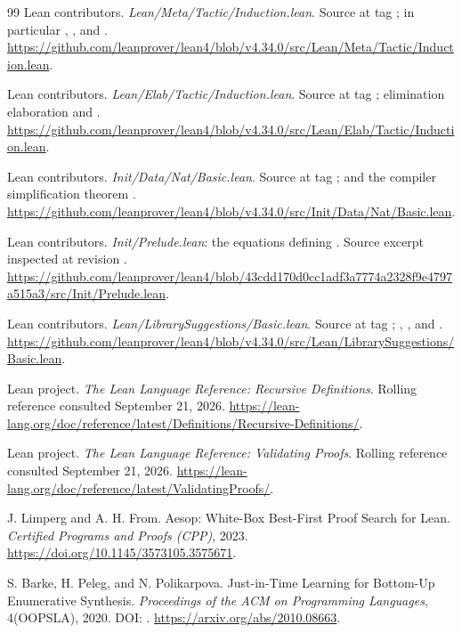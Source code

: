 \begin{thebibliography}{99}
Lean contributors.
\emph{Lean/Meta/Tactic/Induction.lean}.
Source at tag ; in particular , , and .
\url{https://github.com/leanprover/lean4/blob/v4.34.0/src/Lean/Meta/Tactic/Induction.lean}.

Lean contributors.
\emph{Lean/Elab/Tactic/Induction.lean}.
Source at tag ; elimination elaboration and .
\url{https://github.com/leanprover/lean4/blob/v4.34.0/src/Lean/Elab/Tactic/Induction.lean}.

Lean contributors.
\emph{Init/Data/Nat/Basic.lean}.
Source at tag ;  and the compiler simplification theorem .
\url{https://github.com/leanprover/lean4/blob/v4.34.0/src/Init/Data/Nat/Basic.lean}.

Lean contributors.
\emph{Init/Prelude.lean}: the equations defining .
Source excerpt inspected at revision .
\url{https://github.com/leanprover/lean4/blob/43cdd170d0cc1adf3a7774a2328f9e4797a515a3/src/Init/Prelude.lean}.

Lean contributors.
\emph{Lean/LibrarySuggestions/Basic.lean}.
Source at tag ; , , and .
\url{https://github.com/leanprover/lean4/blob/v4.34.0/src/Lean/LibrarySuggestions/Basic.lean}.

Lean project.
\emph{The Lean Language Reference: Recursive Definitions}.
Rolling reference consulted September 21, 2026.
\url{https://lean-lang.org/doc/reference/latest/Definitions/Recursive-Definitions/}.

Lean project.
\emph{The Lean Language Reference: Validating Proofs}.
Rolling reference consulted September 21, 2026.
\url{https://lean-lang.org/doc/reference/latest/ValidatingProofs/}.

J. Limperg and A. H. From.
Aesop: White-Box Best-First Proof Search for Lean.
\emph{Certified Programs and Proofs (CPP)}, 2023.
\url{https://doi.org/10.1145/3573105.3575671}.

S. Barke, H. Peleg, and N. Polikarpova.
Just-in-Time Learning for Bottom-Up Enumerative Synthesis.
\emph{Proceedings of the ACM on Programming Languages}, 4(OOPSLA), 2020.
DOI: .
\url{https://arxiv.org/abs/2010.08663}.


\end{thebibliography}
